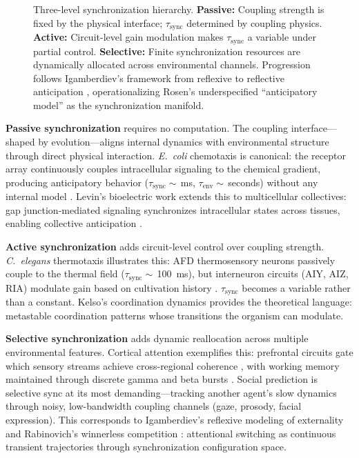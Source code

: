 \documentclass[12pt]{article}
\newcommand{\tsync}{\tau_{\mathrm{sync}}}
\newcommand{\tenv}{\tau_{\mathrm{env}}}
\begin{document}
\begin{figure}[H]
\begin{tikzpicture}
\end{tikzpicture}
\caption{Three-level synchronization hierarchy. \textbf{Passive:} Coupling strength is fixed by the physical interface; $\tsync$ determined by coupling physics. \textbf{Active:} Circuit-level gain modulation makes $\tsync$ a variable under partial control. \textbf{Selective:} Finite synchronization resources are dynamically allocated across environmental channels. Progression follows Igamberdiev's framework from reflexive to reflective anticipation \cite{igamberdiev2015,igamberdiev2017}, operationalizing Rosen's \cite{rosen1985} underspecified ``anticipatory model'' as the synchronization manifold.}
\label{fig:hierarchy}
\end{figure}

\textbf{Passive synchronization} requires no computation. The coupling interface---shaped by evolution---aligns internal dynamics with environmental structure through direct physical interaction. \textit{E.~coli} chemotaxis is canonical: the receptor array continuously couples intracellular signaling to the chemical gradient, producing anticipatory behavior ($\tsync \sim$\,ms, $\tenv \sim$\,seconds) without any internal model \cite{berg2004,segall1986}. Levin's bioelectric work extends this to multicellular collectives: gap junction-mediated signaling synchronizes intracellular states across tissues, enabling collective anticipation \cite{levin2021,levin2019}.

\textbf{Active synchronization} adds circuit-level control over coupling strength. \textit{C.~elegans} thermotaxis illustrates this: AFD thermosensory neurons passively couple to the thermal field ($\tsync \sim$\,100~ms), but interneuron circuits (AIY, AIZ, RIA) modulate gain based on cultivation history \cite{mori1995,clark2006}. $\tsync$ becomes a variable rather than a constant. Kelso's coordination dynamics \cite{kelso1995} provides the theoretical language: metastable coordination patterns whose transitions the organism can modulate.

\textbf{Selective synchronization} adds dynamic reallocation across multiple environmental features. Cortical attention exemplifies this: prefrontal circuits gate which sensory streams achieve cross-regional coherence \cite{fries2005}, with working memory maintained through discrete gamma and beta bursts \cite{miller2018,lundqvist2016}. Social prediction is selective sync at its most demanding---tracking another agent's slow dynamics through noisy, low-bandwidth coupling channels (gaze, prosody, facial expression). This corresponds to Igamberdiev's reflexive modeling of externality \cite{igamberdiev2017} and Rabinovich's winnerless competition \cite{rabinovich2008}: attentional switching as continuous transient trajectories through synchronization configuration space.
\end{document}
